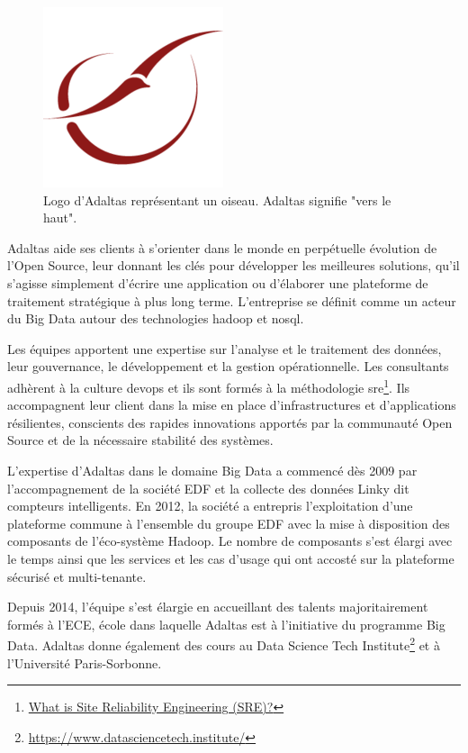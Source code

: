 \documentclass[12pt, french]{report}
\begin{document}
\begin{figure}[H]
\includegraphics[scale=0.4]{assets/img/logo-adaltas.png}
\centering
\caption{Logo d'Adaltas représentant un oiseau. Adaltas signifie "vers le haut".}
\label{fig:logo-adaltas}
\end{figure}

Adaltas aide ses clients à s’orienter dans le monde en perpétuelle évolution de l’Open Source, leur donnant les clés pour développer les meilleures solutions, qu’il s’agisse simplement d’écrire une application ou d’élaborer une plateforme de traitement stratégique à plus long terme. L'entreprise se définit comme un acteur du Big Data autour des technologies \gls{hadoop} et \gls{nosql}.

Les équipes apportent une expertise sur l’analyse et le traitement des données, leur gouvernance, le développement et la gestion opérationnelle. Les consultants adhèrent à la culture \gls{devops} et ils sont formés à la méthodologie \gls{sre}\footnote{\href{https://landing.google.com/sre/}{What is Site Reliability Engineering (SRE)?}}. Ils accompagnent leur client dans la mise en place d’infrastructures et d’applications résilientes, conscients des rapides innovations apportés par la communauté Open Source et de la nécessaire stabilité des systèmes.

L'expertise d'Adaltas dans le domaine Big Data a commencé dès 2009 par l'accompagnement de la société EDF et la collecte des données Linky dit compteurs intelligents. En 2012, la société a entrepris l’exploitation d'une plateforme commune à l'ensemble du groupe EDF avec la mise à disposition des composants de l’éco-système Hadoop. Le nombre de composants s'est élargi avec le temps ainsi que les services et les cas d’usage qui ont accosté sur la plateforme sécurisé et multi-tenante.

Depuis 2014, l’équipe s’est élargie en accueillant des talents majoritairement formés à l’ECE, école dans laquelle Adaltas est à l’initiative du programme Big Data. Adaltas donne également des cours au Data Science Tech Institute\footnote{\href{https://www.datasciencetech.institute/}{https://www.datasciencetech.institute/}} et à l’Université Paris-Sorbonne.
\end{document}
